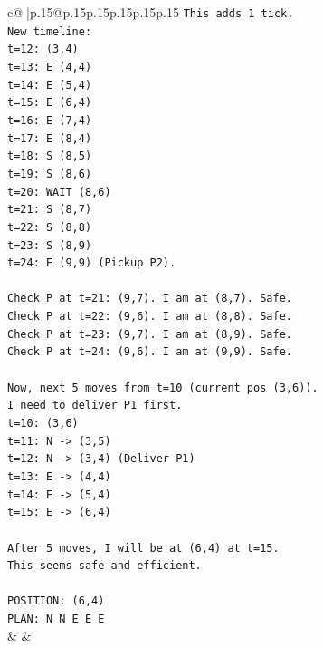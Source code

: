 \documentclass{article}
\begin{document}
{\begin{supertabular}{c@{$\;$}|p{.15\linewidth}@{}p{.15\linewidth}p{.15\linewidth}p{.15\linewidth}p{.15\linewidth}p{.15\linewidth}}
{{{\texttt{This adds 1 tick.} \\
\texttt{New timeline:} \\
\texttt{t=12: (3,4)} \\
\texttt{t=13: E (4,4)} \\
\texttt{t=14: E (5,4)} \\
\texttt{t=15: E (6,4)} \\
\texttt{t=16: E (7,4)} \\
\texttt{t=17: E (8,4)} \\
\texttt{t=18: S (8,5)} \\
\texttt{t=19: S (8,6)} \\
\texttt{t=20: WAIT (8,6)} \\
\texttt{t=21: S (8,7)} \\
\texttt{t=22: S (8,8)} \\
\texttt{t=23: S (8,9)} \\
\texttt{t=24: E (9,9) (Pickup P2).} \\
\\ 
\texttt{Check P at t=21: (9,7). I am at (8,7). Safe.} \\
\texttt{Check P at t=22: (9,6). I am at (8,8). Safe.} \\
\texttt{Check P at t=23: (9,7). I am at (8,9). Safe.} \\
\texttt{Check P at t=24: (9,6). I am at (9,9). Safe.} \\
\\ 
\texttt{Now, next 5 moves from t=10 (current pos (3,6)).} \\
\texttt{I need to deliver P1 first.} \\
\texttt{t=10: (3,6)} \\
\texttt{t=11: N {-}> (3,5)} \\
\texttt{t=12: N {-}> (3,4) (Deliver P1)} \\
\texttt{t=13: E {-}> (4,4)} \\
\texttt{t=14: E {-}> (5,4)} \\
\texttt{t=15: E {-}> (6,4)} \\
\\ 
\texttt{After 5 moves, I will be at (6,4) at t=15.} \\
\texttt{This seems safe and efficient.} \\
\\ 
\texttt{POSITION: (6,4)} \\
\texttt{PLAN: N N E E E} \\
            }
        }
    }
    & & \\ \\


\end{supertabular}}
\end{document}
